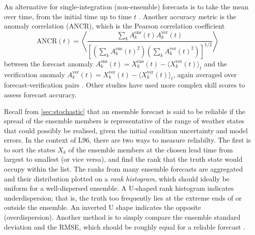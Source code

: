 \documentclass[../main.tex]{subfiles}
\begin{document}
An alternative for single-integration (non-ensemble) forecasts is to take the
mean over time, from the initial time up to time $t$ \parencite{bhouri2023}.
Another accuracy metric is the anomaly correlation (ANCR), which is the Pearson
correlation coefficient
\begin{equation*}
    \mathrm{ANCR}(t) = \left\langle
        \frac{
            \sum_k A_k^\text{ens}(t) A_k^\text{ver}(t)
        }{
            \left[
                \left( \sum_k A_k^\text{ens}(t)^2 \right)
                \left( \sum_k A_k^\text{ver}(t)^2 \right)
            \right]^{1/2}
        }
    \right\rangle
\end{equation*}
between the forecast anomaly $A_k^\text{ens}(t) = X_k^\text{ens}(t) - \langle
X_k^\text{ver}(t) \rangle_t$ and the verification anomaly $A_k^\text{ver}(t) =
X_k^\text{ver}(t) - \langle X_k^\text{ver}(t) \rangle_t$, again averaged over
forecast-verification pairs \parencite{crommelin2008}. Other studies
\parencite{kwasniok2012,arnold2013} have used more complex skill scores to
assess forecast accuracy.

Recall from \cref{sec:stochastic} that an ensemble forecast is said to be
reliable if the spread of the ensemble members is representative of the range
of weather states that could possibly be realised, given the initial condition
uncertainty and model errors. In the context of L96, there are two ways to
measure reliabilty. The first \parencite{wilks2005,crommelin2008,kwasniok2012}
is to sort the states $X_k$ of the ensemble members at the chosen lead time
from largest to smallest (or vice versa), and find the rank that the truth
state would occupy within the list. The ranks from many ensemble forecasts are
aggregated and their distribution plotted on a \emph{rank histogram}, which
should ideally be uniform for a well-dispersed ensemble. A U-shaped rank
histogram indicates underdispersion; that is, the truth too frequently lies at
the extreme ends of or outside the ensemble. An inverted U shape indicates the
opposite (overdispersion). Another method is to simply compare the ensemble
standard deviation and the RMSE, which should be roughly equal for a reliable
forecast \parencite{arnold2013,gagne2020}.
\end{document}
